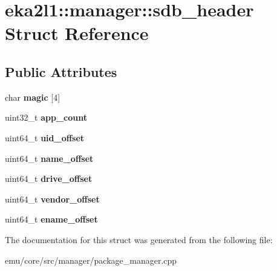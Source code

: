 \hypertarget{structeka2l1_1_1manager_1_1sdb__header}{}\section{eka2l1\+:\+:manager\+:\+:sdb\+\_\+header Struct Reference}
\label{structeka2l1_1_1manager_1_1sdb__header}
\subsection*{Public Attributes}
\begin{DoxyCompactItemize}
\item 
\mbox{\label{structeka2l1_1_1manager_1_1sdb__header_a7ec7c89e52a0f241b68a2de2fd237117}} 
char {\bfseries magic} \mbox{[}4\mbox{]}
\item 
\mbox{\label{structeka2l1_1_1manager_1_1sdb__header_a36fbb56c0f6ff0ca2a66b4c26b9d8cb6}} 
uint32\+\_\+t {\bfseries app\+\_\+count}
\item 
\mbox{\label{structeka2l1_1_1manager_1_1sdb__header_a8759b6349a7c59a7b4f4b29c66471380}} 
uint64\+\_\+t {\bfseries uid\+\_\+offset}
\item 
\mbox{\label{structeka2l1_1_1manager_1_1sdb__header_a21f4491a2020d0a86bb58f15ea2110ed}} 
uint64\+\_\+t {\bfseries name\+\_\+offset}
\item 
\mbox{\label{structeka2l1_1_1manager_1_1sdb__header_ac677ff0458298776c4f6d15241164261}} 
uint64\+\_\+t {\bfseries drive\+\_\+offset}
\item 
\mbox{\label{structeka2l1_1_1manager_1_1sdb__header_a8cbb01a14aa7524583198c221009c06f}} 
uint64\+\_\+t {\bfseries vendor\+\_\+offset}
\item 
\mbox{\label{structeka2l1_1_1manager_1_1sdb__header_a48aeb7c10e0f6fce750dbe8c0159dbc0}} 
uint64\+\_\+t {\bfseries ename\+\_\+offset}
\end{DoxyCompactItemize}


The documentation for this struct was generated from the following file\+:\begin{DoxyCompactItemize}
\item 
emu/core/src/manager/package\+\_\+manager.\+cpp\end{DoxyCompactItemize}
